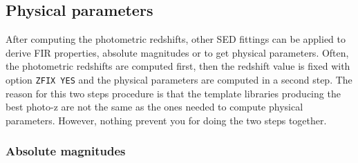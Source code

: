 \documentclass[12pt]{article}
\begin{document}
\subsection {Physical parameters}

After computing the photometric redshifts, other SED fittings can be applied to 
derive FIR properties, absolute magnitudes or to get physical parameters. 
Often, the photometric redshifts are computed first, then the redshift value is fixed with option \texttt{ZFIX YES} and the physical parameters are computed in a second step. The reason for this two steps procedure is that the template libraries producing the best photo-z are not the same as the ones needed to compute physical parameters. However, nothing prevent you for doing the two steps together.  \\
 
\subsubsection{Absolute magnitudes}
\end{document}
